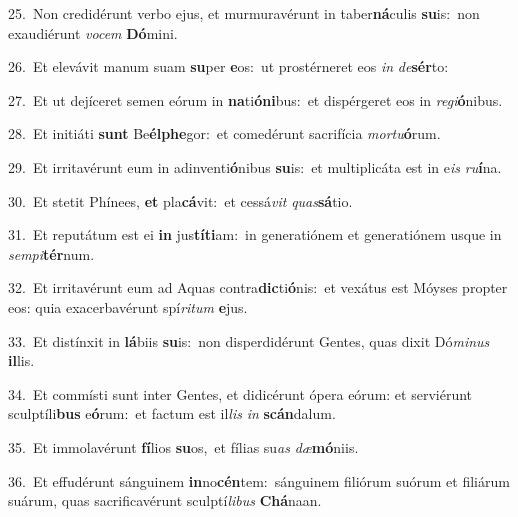 {\numbfont\textcolor{\numbcolor}{25.}}~Non credidérunt verbo ejus, et murmuravérunt in taber\-\textbf{ná}\-culis \textbf{su}\-is:~\star non exaudiérunt \textit{vo}\-\textit{cem} \textbf{Dó}\-mini.\par
{\numbfont\textcolor{\numbcolor}{26.}}~Et elevávit manum suam \textbf{su}\-per \textbf{e}\-os:~\star ut prostérneret eos \textit{in} \textit{de}\-\textbf{sér}to:\par
{\numbfont\textcolor{\numbcolor}{27.}}~Et ut dejíceret semen eórum in \textbf{na}\-ti\-\textbf{ó}\-\textbf{ni}bus:~\star et dispérgeret eos in \textit{re}\-\textit{gi}\textbf{ó}nibus.\par
{\numbfont\textcolor{\numbcolor}{28.}}~Et initiáti \textbf{sunt} Be\-\textbf{él}\-\textbf{phe}gor:~\star et comedérunt sacrifícia \textit{mor}\-\textit{tu}\textbf{ó}rum.\par
{\numbfont\textcolor{\numbcolor}{29.}}~Et irritavérunt eum in adinventi\-\textbf{ó}\-nibus \textbf{su}\-is:~\star et multiplicáta est in e\textit{is} \textit{ru}\-\textbf{í}na.\par
{\numbfont\textcolor{\numbcolor}{30.}}~Et stetit Phínees, \textbf{et} pla\-\textbf{cá}\-vit:~\star et cessá\textit{vit} \textit{quas}\-\textbf{sá}tio.\par
{\numbfont\textcolor{\numbcolor}{31.}}~Et reputátum est ei \textbf{in} jus\-\textbf{tí}\-\textbf{ti}am:~\star in generatiónem et generatiónem usque in \textit{sem}\-\textit{pi}\textbf{tér}num.\par
{\numbfont\textcolor{\numbcolor}{32.}}~Et irritavérunt eum ad Aquas contra\-\textbf{dic}\-ti\-\textbf{ó}\-nis:~\star et vexátus est Móyses propter eos: quia exacerbavérunt spí\-\textit{ri}\-\textit{tum} \textbf{e}\-jus.\par
{\numbfont\textcolor{\numbcolor}{33.}}~Et distínxit in \textbf{lá}\-biis \textbf{su}\-is:~\star non disperdidérunt Gentes, quas dixit Dó\-\textit{mi}\-\textit{nus} \textbf{il}\-lis.\par
{\numbfont\textcolor{\numbcolor}{34.}}~Et commísti sunt inter Gentes, et didicérunt ópera eórum: et serviérunt sculptíli\textbf{bus} e\-\textbf{ó}\-rum:~\star et factum est il\textit{lis} \textit{in} \textbf{scán}\-dalum.\par
{\numbfont\textcolor{\numbcolor}{35.}}~Et immolavérunt \textbf{fí}\-lios \textbf{su}\-os,~\star et fílias su\textit{as} \textit{dæ}\-\textbf{mó}niis.\par
{\numbfont\textcolor{\numbcolor}{36.}}~Et effudérunt sánguinem \textbf{in}\-no\-\textbf{cén}\-tem:~\star sánguinem filiórum suórum et filiárum suárum, quas sacrificavérunt sculptí\-\textit{li}\-\textit{bus} \textbf{Chá}\-naan.\par
